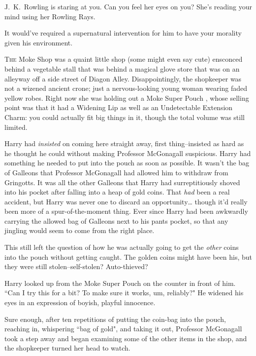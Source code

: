 
\begin{chapterOpeningAuthorNote}
J.~K.~Rowling is staring at you. Can you feel her eyes on you? She's reading your mind using her Rowling Rays.
\end{chapterOpeningAuthorNote}
\begin{chapterOpeningQuote}
It would've required a supernatural intervention for him to have your morality given his environment.
\end{chapterOpeningQuote}

\lettrine{T}{he} Moke Shop was a quaint little shop (some might even say cute) ensconced behind a vegetable stall that was behind a magical glove store that was on an alleyway off a side street of Diagon Alley. Disappointingly, the shopkeeper was not a wizened ancient crone; just a nervous-looking young woman wearing faded yellow robes. Right now she was holding out a Moke Super Pouch , whose selling point was that it had a Widening Lip as well as an Undetectable Extension Charm: you could actually fit big things in it, though the total volume was still limited.

Harry had \emph{insisted} on coming here straight away, first thing\---insisted as hard as he thought he could without making Professor McGonagall suspicious. Harry had something he needed to put into the pouch as soon as possible. It wasn't the bag of Galleons that Professor McGonagall had allowed him to withdraw from Gringotts. It was all the other Galleons that Harry had surreptitiously shoved into his pocket after falling into a heap of gold coins. That \emph{had} been a real accident, but Harry was never one to discard an opportunity{\ldots} though it'd really been more of a spur-of-the-moment thing. Ever since Harry had been awkwardly carrying the allowed bag of Galleons next to his pants pocket, so that any jingling would seem to come from the right place.

This still left the question of how he was actually going to get the \emph{other} coins into the pouch without getting caught. The golden coins might have been his, but they were still stolen\---self-stolen? Auto-thieved?

Harry looked up from the Moke Super Pouch  on the counter in front of him. ``Can I try this for a bit? To make sure it works, um, reliably?" He widened his eyes in an expression of boyish, playful innocence.

Sure enough, after ten repetitions of putting the coin-bag into the pouch, reaching in, whispering ``bag of gold", and taking it out, Professor McGonagall took a step away and began examining some of the other items in the shop, and the shopkeeper turned her head to watch.

